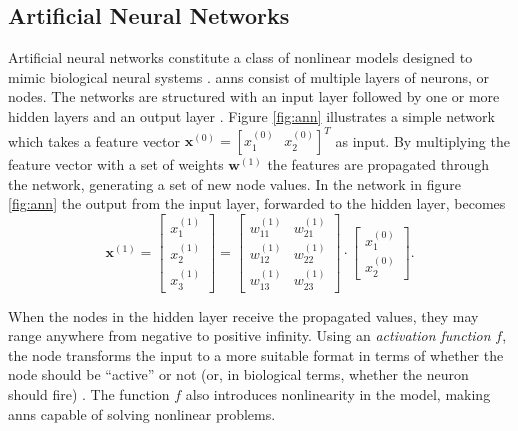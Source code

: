 

\subsection{Artificial Neural Networks}
Artificial neural networks constitute a class of nonlinear models designed to mimic biological neural systems \citep{rojas_1996}. \gls{ann}s consist of multiple layers of neurons, or nodes. The networks are structured with an input layer followed by one or more hidden layers and an output layer \citep{logan_2017}. Figure \ref{fig:ann} illustrates a simple network which takes a feature vector $\mathbf{x}^{(0)}=[x_1^{(0)}\text{ }  x_2^{(0)}]^{T}$ as input. By multiplying the feature vector with a set of weights $\mathbf{w}^{(1)}$ the features are propagated through the network, generating a set of new node values. In the network in figure \ref{fig:ann} the output from the input layer, forwarded to the hidden layer, becomes
\begin{equation}\label{eq:nn}
	\mathbf{x}^{(1)}=\begin{bmatrix}x_1^{(1)} \\ x_2^{(1)} \\ x_3^{(1)} \end{bmatrix} = 
	\begin{bmatrix} w_{11}^{(1)} & w_{21}^{(1)} \\ w_{12}^{(1)} & w_{22}^{(1)} \\ w_{13}^{(1)} & w_{23}^{(1)}\end{bmatrix}\cdot \begin{bmatrix}x_1^{(0)} \\ x_2^{(0)}\end{bmatrix}.
\end{equation}

When the nodes in the hidden layer receive the propagated values, they may range anywhere from negative to positive infinity. Using an \textit{activation function} $f$, the node transforms the input to a more suitable format in terms of whether the node should be ``active'' or not (or, in biological terms, whether the neuron should fire) \citep{kriesel_2007}. The function $f$ also introduces nonlinearity in the model, making \gls{ann}s capable of solving nonlinear problems. 

